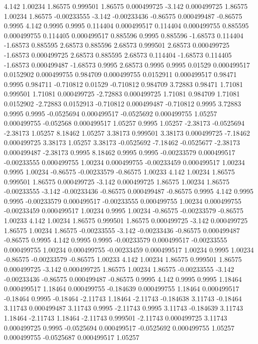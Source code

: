 4.142 1.00234
1.86575 0.999501
1.86575 0.000499725
-3.142 0.000499725
1.86575 1.00234
1.86575 -0.00233555
-3.142 -0.00233436
-0.86575 0.000499487
-0.86575 0.9995
4.142 0.9995
0.9995 0.114404
0.000499517 0.114404
0.000499755 0.885595
0.000499755 0.114405
0.000499517 0.885596
0.9995 0.885596
-1.68573 0.114404
-1.68573 0.885595
2.68573 0.885596
2.68573 0.999501
2.68573 0.000499725
-1.68573 0.000499725
2.68573 0.885595
2.68573 0.114404
-1.68573 0.114405
-1.68573 0.000499487
-1.68573 0.9995
2.68573 0.9995
0.9995 0.01529
0.000499517 0.0152902
0.000499755 0.984709
0.000499755 0.0152911
0.000499517 0.98471
0.9995 0.984711
-0.710812 0.01529
-0.710812 0.984709
3.72883 0.98471
1.71081 0.999501
1.71081 0.000499725
-2.72883 0.000499725
1.71081 0.984709
1.71081 0.0152902
-2.72883 0.0152913
-0.710812 0.000499487
-0.710812 0.9995
3.72883 0.9995
0.9995 -0.0525694
0.000499517 -0.0525692
0.000499755 1.05257
0.000499755 -0.052568
0.000499517 1.05257
0.9995 1.05257
-2.38173 -0.0525694
-2.38173 1.05257
8.18462 1.05257
3.38173 0.999501
3.38173 0.000499725
-7.18462 0.000499725
3.38173 1.05257
3.38173 -0.0525692
-7.18462 -0.0525677
-2.38173 0.000499487
-2.38173 0.9995
8.18462 0.9995
0.9995 -0.00233579
0.000499517 -0.00233555
0.000499755 1.00234
0.000499755 -0.00233459
0.000499517 1.00234
0.9995 1.00234
-0.86575 -0.00233579
-0.86575 1.00233
4.142 1.00234
1.86575 0.999501
1.86575 0.000499725
-3.142 0.000499725
1.86575 1.00234
1.86575 -0.00233555
-3.142 -0.00233436
-0.86575 0.000499487
-0.86575 0.9995
4.142 0.9995
0.9995 -0.00233579
0.000499517 -0.00233555
0.000499755 1.00234
0.000499755 -0.00233459
0.000499517 1.00234
0.9995 1.00234
-0.86575 -0.00233579
-0.86575 1.00233
4.142 1.00234
1.86575 0.999501
1.86575 0.000499725
-3.142 0.000499725
1.86575 1.00234
1.86575 -0.00233555
-3.142 -0.00233436
-0.86575 0.000499487
-0.86575 0.9995
4.142 0.9995
0.9995 -0.00233579
0.000499517 -0.00233555
0.000499755 1.00234
0.000499755 -0.00233459
0.000499517 1.00234
0.9995 1.00234
-0.86575 -0.00233579
-0.86575 1.00233
4.142 1.00234
1.86575 0.999501
1.86575 0.000499725
-3.142 0.000499725
1.86575 1.00234
1.86575 -0.00233555
-3.142 -0.00233436
-0.86575 0.000499487
-0.86575 0.9995
4.142 0.9995
0.9995 1.18464
0.000499517 1.18464
0.000499755 -0.184639
0.000499755 1.18464
0.000499517 -0.18464
0.9995 -0.18464
-2.11743 1.18464
-2.11743 -0.184638
3.11743 -0.18464
3.11743 0.000499487
3.11743 0.9995
-2.11743 0.9995
3.11743 -0.184639
3.11743 1.18464
-2.11743 1.18464
-2.11743 0.999501
-2.11743 0.000499725
3.11743 0.000499725
0.9995 -0.0525694
0.000499517 -0.0525692
0.000499755 1.05257
0.000499755 -0.0525687
0.000499517 1.05257
